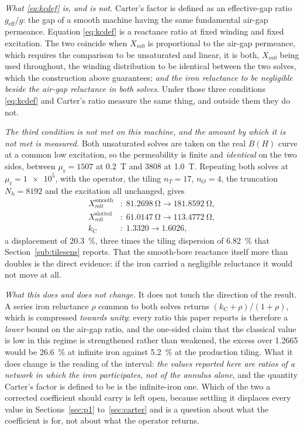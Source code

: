 \documentclass[10pt,a4paper,twocolumn]{article}
\theoremstyle{plain}
\theoremstyle{remark}
\begin{document}
\emph{What \eqref{eq:kcdef} is, and is not.} Carter's factor is defined
as an effective-gap ratio $g_{\text{eff}}/g$: the gap of a smooth
machine having the same fundamental air-gap permeance. Equation
\eqref{eq:kcdef} is a reactance ratio at fixed winding and fixed
excitation. The two coincide when $X_{m0}$ is proportional to the
air-gap permeance, which requires the comparison to be unsaturated and
linear, it is both, $X_{m0}$ being used throughout, the winding
distribution to be identical between the two solves, which the
construction above guarantees; \emph{and the iron reluctance to be
negligible beside the air-gap reluctance in both solves}. Under those
three conditions \eqref{eq:kcdef} and Carter's ratio measure the same
thing, and outside them they do not.

\emph{The third condition is not met on this machine, and the amount by
which it is not met is measured.} Both unsaturated solves are taken on
the real $B(H)$ curve at a common low excitation, so the permeability is
finite and \emph{identical} on the two sides, between
$\mu_{\mathrm{r}}=\num{1507}$ at \SI{0.2}{\tesla} and
$\num{3808}$ at \SI{1.0}{\tesla}. Repeating both solves at
$\mu_{\mathrm{r}}=\num{1e5}$, with the operator, the tiling
$n_T=17$, $n_O=4$, the truncation $N_h=\num{8192}$ and the excitation
all unchanged, gives
\begin{equation}
\begin{aligned}
X_{m0}^{\text{smooth}} &: \;\SI{81.2698}{\ohm}\rightarrow\SI{181.8592}{\ohm},\\
X_{m0}^{\text{slotted}} &: \;\SI{61.0147}{\ohm}\rightarrow\SI{113.4772}{\ohm},\\
k_{\mathrm{C}} &: \;\num{1.3320}\rightarrow\num{1.6026},
\end{aligned}
\label{eq:muinf}
\end{equation}
a displacement of \SI{+20.3}{\percent}, three times the tiling
dispersion of \SI{6.82}{\percent} that Section~\ref{sub:tilesens}
reports. That the smooth-bore reactance itself more than doubles is the
direct evidence: if the iron carried a negligible reluctance it would
not move at all.

\emph{What this does and does not change.} It does not touch the
direction of the result. A series iron reluctance $\rho$ common to both
solves returns $(k_{\mathrm{C}}+\rho)/(1+\rho)$, which is compressed
\emph{towards unity}: every ratio this paper reports is therefore a
\emph{lower} bound on the air-gap ratio, and the one-sided claim that
the classical value is low in this regime is strengthened rather than
weakened, the excess over \num{1.2665} would be \SI{26.6}{\percent}
at infinite iron against \SI{5.2}{\percent} at the production tiling.
What it does change is the reading of the interval: \emph{the values
reported here are ratios of a network in which the iron participates,
not of the annulus alone}, and the quantity Carter's factor is defined
to be is the infinite-iron one. Which of the two a corrected coefficient
should carry is left open, because settling it displaces every value
in Sections~\ref{sec:p1} to~\ref{sec:carter} and is a question about
what the coefficient is for, not about what the operator returns.
\end{document}
